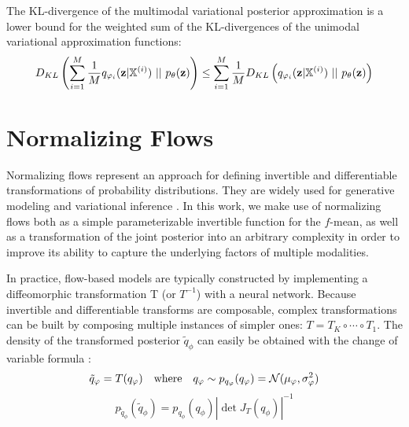 \begin{lemma}
    \label{lemma:DklLowerBound}

    The KL-divergence of the multimodal variational posterior approximation is a lower bound for the weighted sum of the KL-divergences of the unimodal variational approximation functions:
    \begin{equation}
        D_{KL} \left( \sum _{i=1} ^M \frac{1}{M}q_{\varphi_i}(\textbf{z}|\mathbb{X}^{(i)})\ ||\ p_{\theta}(\textbf{z}) \right) \leq \sum _{i=1} ^M \frac{1}{M} D_{KL} \left( q_{\varphi_i}(\textbf{z}|\mathbb{X}^{(i)})\ ||\ p_{\theta}(\textbf{z}) \right)
    \end{equation}
\end{lemma}



\section{Normalizing Flows}
\label{subsec: Normalizing Flows}
Normalizing flows \parencite{papamakarios_normalizing_2019} represent an approach for defining invertible and differentiable transformations of probability distributions.
They are widely used for generative modeling \citep[\textbf{GLOW}, \textbf{Real NVP}]{kingma_glow_2018, dinh_density_2017} and variational inference \parencite{rezende_variational_2016, berg_sylvester_2019}.
In this work, we make use of normalizing flows both as a simple parameterizable invertible function for the $f$-mean, as well as a transformation of the joint posterior into an arbitrary complexity in order to improve its ability to capture the underlying factors of multiple modalities.

In practice, flow-based models are typically constructed by implementing a diffeomorphic transformation T (or $T^{-1}$) with a neural network.
Because invertible and differentiable transforms are composable, complex transformations can be built by composing multiple instances of simpler ones: $T=T_K \circ \cdots \circ T_1$.
The density of the transformed posterior $\tilde{q}_{\phi}$ can easily be obtained with the change of variable formula \parencite{bogachev2007measure}:
\begin{equation}
    \tilde{q}_{\varphi} = T(q_{\varphi}) \quad \text{where} \quad q_{\varphi} \sim p_{q_{\varphi}}(q_{\varphi}) = \mathcal{N}(\mu_{\varphi}, \sigma^2_{\varphi})
\end{equation}
\begin{equation}
    \label{eq:changeofvariables}
    p_{\tilde{q}_{\phi}}(\tilde{q}_{\phi}) = p_{q_{\phi}}(q_{\phi})|\det J_T(q_{\phi})|^{-1}
\end{equation}

